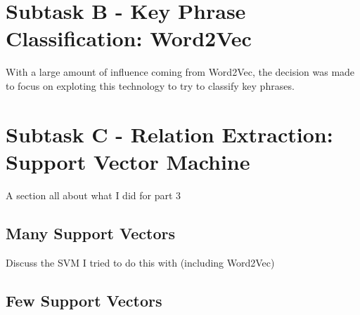 \section{Subtask B - Key Phrase Classification: Word2Vec}
With a large amount of influence coming from Word2Vec, the decision was made to focus on exploting this technology to try to classify key phrases.

\section{Subtask C - Relation Extraction: Support Vector Machine}
A section all about what I did for part 3
\subsection{Many Support Vectors}
Discuss the SVM I tried to do this with (including Word2Vec)
\subsection{Few Support Vectors}

